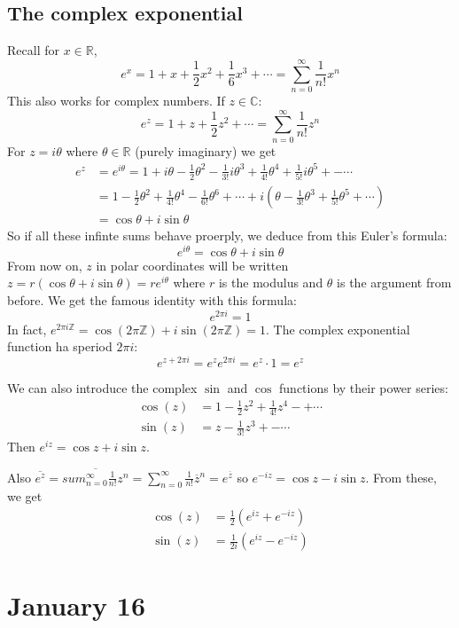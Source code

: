 \documentclass{article}
\theoremstyle{plain}
\theoremstyle{remark}
\newcommand{\Z}{{\mathbb Z}}
\newcommand{\R}{{\mathbb R}}
\newcommand{\C}{{\mathbb C}}
\begin{document}
\subsection{The complex exponential}
Recall for $x \in \R$,
\[
	e^x = 1 + x + \frac12x^2 + \frac16x^3 + \cdots = \sum_{n=0}^\infty \frac{1}{n!}x^n
\]
This also works for complex numbers. If $z \in \C$:
\[
	e^z = 1 + z + \frac12z^2 + \cdots = \sum_{n=0}^\infty \frac{1}{n!}z^n
\]
For $z = i\theta$ where $\theta \in \R$ (purely imaginary) we get
\begin{align*}
	e^z &= e^{i\theta} = 1 + i\theta - \frac12 \theta^2 -
	\frac{1}{3!}i\theta^3 + \frac{1}{4!}\theta^4 + \frac{1}{5!}i\theta^5 +- \cdots\\
		&= 1 - \frac12\theta^2 + \frac{1}{4!}\theta^4 - \frac{1}{6!}\theta^6
	+ \cdots +
	i\left(\theta - \frac{1}{3!}\theta^3 + \frac{1}{5!}\theta^5 + \cdots\right)\\
		&= \cos\theta + i\sin\theta
\end{align*}
So if all these infinte sums behave proerply,
we deduce from this Euler's formula:
\[
	e^{i\theta} = \cos\theta + i\sin\theta
\]
From now on, $z$ in polar coordinates will be written
$z = r(\cos\theta + i\sin\theta) = re^{i\theta}$
where $r$ is the modulus and $\theta$ is the argument from before.
We get the famous identity with this formula:
\[
	e^{2\pi i} = 1
\]
In fact, $e^{2\pi i \Z} = \cos(2\pi\Z) + i\sin(2\pi\Z) = 1$.
The complex exponential function ha speriod $2\pi i$:
\[
	e^{z + 2\pi i} = e^ze^{2\pi i} = e^z\cdot 1 = e^z
\]

We can also introduce the complex $\sin$ and $\cos$ functions by their power series:
\begin{align*}
	\cos(z) &= 1 - \frac{1}{2}z^2 + \frac{1}{4!}z^4 -+ \cdots\\
	\sin(z) &= z - \frac{1}{3!}z^3 +- \cdots
\end{align*}
Then $e^{iz} = \cos{z} + i\sin{z}$.

Also $\overline{e^z} = \overline{sum_{n=0}^\infty \frac{1}{n!}z^n}
= \sum_{n=0}^\infty \frac{1}{n!}\overline{z}^n = e^{\overline{z}}$
so $e^{-iz} = \cos{z} - i\sin{z}$.
From these, we get
\begin{align*}
	\cos(z) &= \frac12\left(e^{iz} + e^{-iz}\right)\\
	\sin(z) &= \frac{1}{2i}\left(e^{iz} - e^{-iz}\right)
\end{align*}

\section{January 16}
\end{document}
